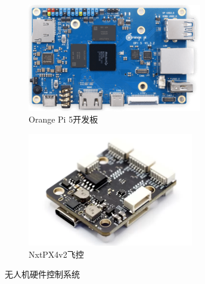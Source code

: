\documentclass[lang=chs, degree=master, blindreview=true, winfonts=true]{yanputhesis}
\begin{document}
\begin{figure}[htb!]
    \centering
    \begin{minipage}[t]{0.96\textwidth}
        \centering
        \begin{subfigure}[t]{0.47\textwidth}
            \centering
            \includegraphics[height = 1.85in]{picture/5_5.png}
            \caption{Orange Pi 5开发板\label{fig.fmtpath}}
        \end{subfigure}\hfill
        \begin{subfigure}[t]{0.47\textwidth}
            \centering
            \includegraphics[height = 1.95in]{picture/5_6.png}
            \caption{NxtPX4v2飞控\label{fig.proximity-tra}}
        \end{subfigure}
    \end{minipage}
    \caption{无人机硬件控制系统}
\end{figure}

     
\end{document}
